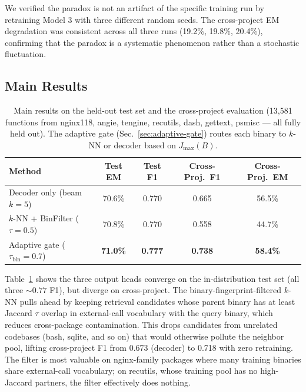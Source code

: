 \documentclass[sigconf,nonacm]{acmart}
\begin{document}
We verified the paradox is not an artifact of the specific training run by retraining Model 3 with three different random seeds. The cross-project EM degradation was consistent across all three runs (19.2\%, 19.8\%, 20.4\%), confirming that the paradox is a systematic phenomenon rather than a stochastic fluctuation.

\subsection{Main Results}

\begin{table}[t]
    \centering
    \caption{Main results on the held-out test set and the cross-project evaluation (13{,}581 functions from nginx118, angie, tengine, recutils, dash, gettext, psmisc --- all fully held out). The adaptive gate (Sec.~\ref{sec:adaptive-gate}) routes each binary to $k$-NN or decoder based on $J_{\max}(B)$.}
    \label{tab:main}
    \footnotesize
    \setlength{\tabcolsep}{3pt}
    \begin{tabular}{@{}lcccc@{}}
        \toprule
        \textbf{Method} & \textbf{Test EM} & \textbf{Test F1} & \textbf{Cross-Proj.\ F1} & \textbf{Cross-Proj.\ EM} \\
        \midrule
        Decoder only (beam $k{=}5$) & 70.6\% & 0.770 & 0.665 & 56.5\% \\
        $k$-NN + BinFilter ($\tau{=}0.5$) & 70.8\% & 0.770 & 0.558 & 44.7\% \\
        Adaptive gate ($\tau_{\text{bin}}{=}0.7$) & \textbf{71.0\%} & \textbf{0.777} & \textbf{0.738} & \textbf{58.4\%} \\
        \bottomrule
    \end{tabular}
\end{table}

Table~\ref{tab:main} shows the three output heads converge on the in-distribution test set (all three ${\sim}0.77$ F1), but diverge on cross-project. The binary-fingerprint-filtered $k$-NN pulls ahead by keeping retrieval candidates whose parent binary has at least Jaccard $\tau$ overlap in external-call vocabulary with the query binary, which reduces cross-package contamination. This drops candidates from unrelated codebases (bash, sqlite, and so on) that would otherwise pollute the neighbor pool, lifting cross-project F1 from 0.673 (decoder) to 0.718 with zero retraining. The filter is most valuable on nginx-family packages where many training binaries share external-call vocabulary; on recutils, whose training pool has no high-Jaccard partners, the filter effectively does nothing.
\end{document}

